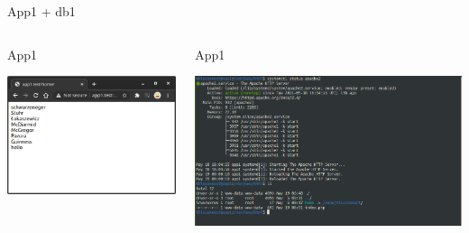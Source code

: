 \documentclass[presentation]{beamer}
\begin{document}
\begin{frame}[label={sec:org87114bc}]{App1 + db1}
\begin{columns}
\begin{column}{0.5\columnwidth}
\begin{block}{App1}
\begin{center}
\includegraphics[width=.9\linewidth]{./data/app/app1.png}
\end{center}
\end{block}
\end{column}
\begin{column}{0.5\columnwidth}
\begin{block}{App1}
\begin{center}
\includegraphics[width=.9\linewidth]{./data/app/app1status.png}
\end{center}
\end{block}
\end{column}
\end{columns}
\end{frame}
\end{document}
